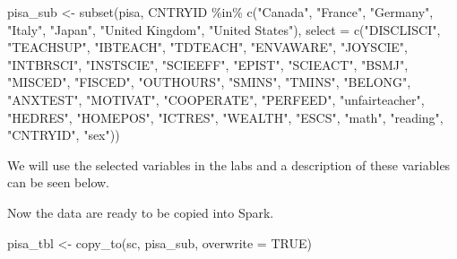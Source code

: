 \documentclass[
]{book}
\newenvironment{Shaded}{\begin{snugshade}}{\end{snugshade}}
\newcommand{\AttributeTok}[1]{\textcolor[rgb]{0.77,0.63,0.00}{#1}}
\newcommand{\ConstantTok}[1]{\textcolor[rgb]{0.00,0.00,0.00}{#1}}
\newcommand{\FunctionTok}[1]{\textcolor[rgb]{0.00,0.00,0.00}{#1}}
\newcommand{\NormalTok}[1]{#1}
\newcommand{\OtherTok}[1]{\textcolor[rgb]{0.56,0.35,0.01}{#1}}
\newcommand{\SpecialCharTok}[1]{\textcolor[rgb]{0.00,0.00,0.00}{#1}}
\newcommand{\StringTok}[1]{\textcolor[rgb]{0.31,0.60,0.02}{#1}}
\begin{document}
\begin{Shaded}
\begin{Highlighting}[]
\NormalTok{pisa\_sub }\OtherTok{\textless{}{-}} \FunctionTok{subset}\NormalTok{(pisa, CNTRYID }\SpecialCharTok{\%in\%} \FunctionTok{c}\NormalTok{(}\StringTok{"Canada"}\NormalTok{, }\StringTok{"France"}\NormalTok{, }\StringTok{"Germany"}\NormalTok{,}
                                        \StringTok{"Italy"}\NormalTok{, }\StringTok{"Japan"}\NormalTok{, }\StringTok{"United Kingdom"}\NormalTok{,}
                                        \StringTok{"United States"}\NormalTok{),}
                   \AttributeTok{select =} \FunctionTok{c}\NormalTok{(}\StringTok{"DISCLISCI"}\NormalTok{, }\StringTok{"TEACHSUP"}\NormalTok{, }\StringTok{"IBTEACH"}\NormalTok{, }\StringTok{"TDTEACH"}\NormalTok{,}
                              \StringTok{"ENVAWARE"}\NormalTok{, }\StringTok{"JOYSCIE"}\NormalTok{, }\StringTok{"INTBRSCI"}\NormalTok{, }\StringTok{"INSTSCIE"}\NormalTok{,}
                              \StringTok{"SCIEEFF"}\NormalTok{, }\StringTok{"EPIST"}\NormalTok{, }\StringTok{"SCIEACT"}\NormalTok{, }\StringTok{"BSMJ"}\NormalTok{, }\StringTok{"MISCED"}\NormalTok{,}
                              \StringTok{"FISCED"}\NormalTok{, }\StringTok{"OUTHOURS"}\NormalTok{, }\StringTok{"SMINS"}\NormalTok{, }\StringTok{"TMINS"}\NormalTok{,}
                              \StringTok{"BELONG"}\NormalTok{, }\StringTok{"ANXTEST"}\NormalTok{, }\StringTok{"MOTIVAT"}\NormalTok{, }\StringTok{"COOPERATE"}\NormalTok{,}
                              \StringTok{"PERFEED"}\NormalTok{, }\StringTok{"unfairteacher"}\NormalTok{, }\StringTok{"HEDRES"}\NormalTok{, }\StringTok{"HOMEPOS"}\NormalTok{,}
                              \StringTok{"ICTRES"}\NormalTok{, }\StringTok{"WEALTH"}\NormalTok{, }\StringTok{"ESCS"}\NormalTok{, }\StringTok{"math"}\NormalTok{, }\StringTok{"reading"}\NormalTok{,}
                              \StringTok{"CNTRYID"}\NormalTok{, }\StringTok{"sex"}\NormalTok{))}
\end{Highlighting}
\end{Shaded}

We will use the selected variables in the labs and a description of these variables can be seen below.

Now the data are ready to be copied into Spark.

\begin{Shaded}
\begin{Highlighting}[]
\NormalTok{pisa\_tbl }\OtherTok{\textless{}{-}} \FunctionTok{copy\_to}\NormalTok{(sc, pisa\_sub, }\AttributeTok{overwrite =} \ConstantTok{TRUE}\NormalTok{)}
\end{Highlighting}
\end{Shaded}
\end{document}
